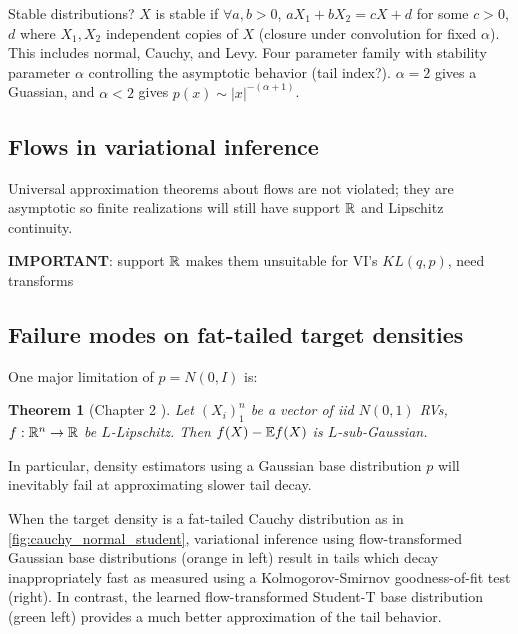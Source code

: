 \documentclass{scrartcl}
\newtheorem{theorem}{Theorem}
\theoremstyle{definition}
\begin{document}
Stable distributions? $X$ is stable if $\forall a, b > 0$, 
$a X_1 + b X_2 = c X + d$ for some $c > 0$, $d$ where $X_1, X_2$ independent copies of $X$
(closure under convolution for fixed $\alpha$).
This includes normal, Cauchy, and Levy. Four parameter family with stability parameter $\alpha$
controlling the asymptotic behavior (tail index?). $\alpha = 2$ gives a Guassian,
and $\alpha < 2$ gives $p(x) \sim \lvert x \rvert^{-(\alpha + 1)}$.


\subsection{Flows in variational inference}

Universal approximation theorems about flows are not violated; they are asymptotic
so finite realizations will still have support $\mathbb{R}$ and Lipschitz continuity.

\textbf{IMPORTANT}: support $\mathbb{R}$ makes them unsuitable for VI's $KL(q,p)$, need \cite{kucukelbir2017automatic}
transforms

\subsection{Failure modes on fat-tailed target densities}
\label{ssec:failure}

One major limitation of $p = N(0,I)$ is:
\begin{theorem}[Chapter 2 \cite{wainwright2019high}]
    Let $(X_i)_1^n$ be a vector of iid $N(0,1)$ RVs,
    $f : \mathbb{R}^n \to \mathbb{R}$ be $L$-Lipschitz.
    Then $f(X) - \mathbb{E} f(X)$ is $L$-sub-Gaussian.
\end{theorem}
In particular, density estimators using a Gaussian base
distribution $p$ will inevitably fail at approximating slower
tail decay.

When the target density is a fat-tailed Cauchy distribution as in
\cref{fig:cauchy_normal_student}, variational inference using
flow-transformed Gaussian base distributions \cite{webb2019improving} (orange
in left) result in tails which decay inappropriately fast as measured
using a Kolmogorov-Smirnov goodness-of-fit test (right). In contrast,
the learned flow-transformed Student-T base distribution (green left)
provides a much better approximation of the tail behavior.
\end{document}
